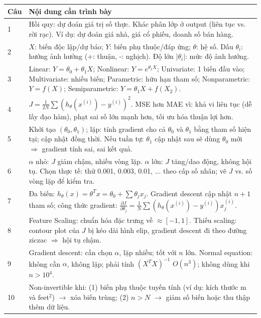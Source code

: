 \documentclass[10pt]{article}
\begin{document}
\begin{singlespace}
\begin{longtable}{|p{}|p{}|}
\hline
\textbf{Câu} & \textbf{Nội dung cần trình bày} \\
\hline
\endhead
1 & Hồi quy: dự đoán giá trị số thực. Khác phân lớp ở output (liên tục vs. rời rạc). Ví dụ: dự đoán giá nhà, giá cổ phiếu, doanh số bán hàng. \\
\hline
2 & $X$: biến độc lập/dự báo; $Y$: biến phụ thuộc/đáp ứng; $\theta$: hệ số. Dấu $\theta_i$: hướng ảnh hưởng (+: thuận, -: nghịch). Độ lớn $|\theta_i|$: mức độ ảnh hưởng. \\
\hline
3 & Linear: $Y = \theta_0 + \theta_1 X$; Nonlinear: $Y = e^{\theta_1 X}$; Univariate: 1 biến đầu vào; Multivariate: nhiều biến; Parametric: hữu hạn tham số; Nonparametric: $Y = f(X)$; Semiparametric: $Y = \theta_1 X + f(X_2)$. \\
\hline
4 & $J = \frac{1}{2N}\sum(h_\theta(x^{(i)}) - y^{(i)})^2$. MSE hơn MAE vì: khả vi liên tục (dễ lấy đạo hàm), phạt sai số lớn mạnh hơn, tối ưu hóa thuận lợi hơn. \\
\hline
5 & Khởi tạo $(\theta_0, \theta_1)$; lặp: tính gradient cho cả $\theta_0$ và $\theta_1$ bằng tham số hiện tại; cập nhật đồng thời. Nếu tuần tự: $\theta_1$ cập nhật sau sẽ dùng $\theta_0$ mới $\Rightarrow$ gradient tính sai, sai kết quả. \\
\hline
6 & $\alpha$ nhỏ: $J$ giảm chậm, nhiều vòng lặp. $\alpha$ lớn: $J$ tăng/dao động, không hội tụ. Chọn thực tế: thử 0.001, 0.003, 0.01, ... theo cấp số nhân; vẽ $J$ vs. số vòng lặp để kiểm tra. \\
\hline
7 & Đa biến: $h_\theta(x) = \theta^T x = \theta_0 + \sum \theta_j x_j$. Gradient descent cập nhật $n+1$ tham số; công thức gradient: $\frac{\partial J}{\partial \theta_j} = \frac{1}{N}\sum(h_\theta(x^{(i)}) - y^{(i)})x_j^{(i)}$. \\
\hline
8 & Feature Scaling: chuẩn hóa đặc trưng về $\approx [-1,1]$. Thiếu scaling: contour plot của $J$ bị kéo dài hình elip, gradient descent đi theo đường ziczac $\Rightarrow$ hội tụ chậm. \\
\hline
9 & Gradient descent: cần chọn $\alpha$, lặp nhiều; tốt với $n$ lớn. Normal equation: không cần $\alpha$, không lặp; phải tính $(X^TX)^{-1}$ $O(n^3)$; không dùng khi $n > 10^4$. \\
\hline
10 & Non-invertible khi: (1) biến phụ thuộc tuyến tính (ví dụ: kích thước m và feet$^2$) $\to$ xóa biến trùng; (2) $n > N$ $\to$ giảm số biến hoặc thu thập thêm dữ liệu. \\

\end{longtable}
\end{singlespace}
\end{document}
